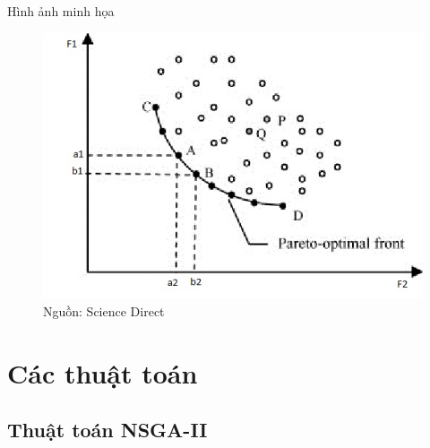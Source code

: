 \documentclass{beamer}
\begin{document}
    \begin{frame}{Hình ảnh minh họa}
        \begin{figure}
        \includegraphics[scale = 0.6]{paretofront.jpg}
        \caption{Nguồn: Science Direct}
        \end{figure}
    \end{frame}


\section{\textbf{Các thuật toán}}
\subsection{\textbf{Thuật toán NSGA-II}}
\end{document}
